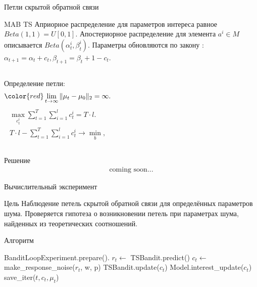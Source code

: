 \documentclass{beamer}
\begin{document}
\begin{frame}{Петли скрытой обратной связи}
  \begin{block}{MAB TS}
Априорное распределение для параметров интереса равное $Beta(1, 1) = U[0, 1]$. 
Апостериорное распределение для элемента $a^i \in M$ описывается $Beta(\alpha_t^i, \beta_t^i)$. 
Параметры обновляются по закону :
$\alpha_{t+1} = \alpha_t + c_t, \beta_{t+1} = \beta_t + 1 - c_t$.
\end{block}
\begin{columns}[c]
  Определение петли:
\begin{gather*}
  \color{red} \lim_{t \to \infty} \|\mu_t - \mu_0 \|_2 = \infty.
\end{gather*}
\begin{gather*}  
\max_{c_t^i} \sum_{t = 1}^T \sum_{i = 1}^l c_t^i = T \cdot l.\\ 
   T \cdot l - \sum_{t = 1}^T \sum_{i = 1}^l c_t^i \to \min_{b}, 
\end{gather*}
\end{columns}
\end{frame}
\begin{frame}{Решение}
  \begin{gather*}
    \text{coming soon...}
  \end{gather*}
\end{frame}
\begin{frame}{Вычислительный эксперимент}
\begin{block}{Цель}
Наблюдение петель скрытой обратной связи для определённых параметров шума. 
Проверяется гипотеза о возникновении петель при параметрах шума, найденных из теоретических соотношений. 
\end{block}

\begin{block}{Алгоритм}
\begin{algorithmic}
  \STATE BanditLoopExperiment.prepare().
    \STATE $r_t \leftarrow$ TSBandit.predict()
    \STATE $c_t \leftarrow$ make\_response\_noise($r_t$, w, p)
    \STATE TSBandit.update($c_t$)
    \STATE Model.interest\_update($c_t$)
    \STATE save\_iter($t, c_t, \mu_t$)
  \ENDFOR
\end{algorithmic}
\end{block}

\end{frame}
\end{document}

